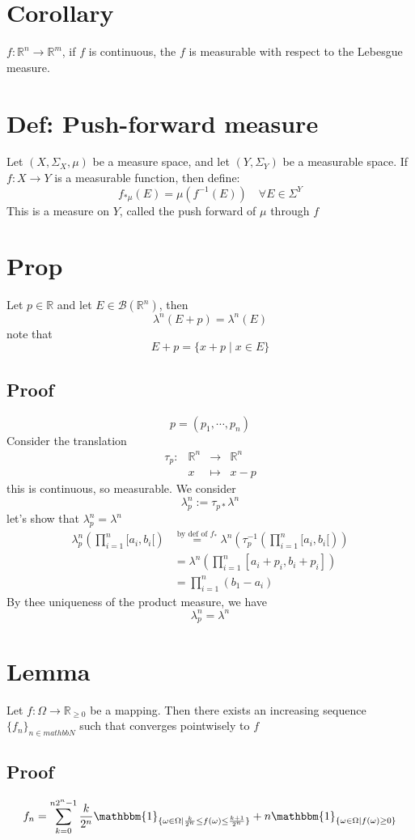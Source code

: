 \documentclass{book}
\newcommand{\leftbracket}{[}
\newcommand{\rightbracket}{]}
\begin{document}
\section{Corollary}
$f:\mathbb{R}^n\rightarrow\mathbb{R}^m$, if $f$ is continuous, the $f$ is measurable with respect to the Lebesgue measure.
\section{Def: Push-forward measure}
Let $(X,\Sigma_X,\mu)$ be a measure space, and let $(Y,\Sigma_Y)$ be a measurable space. If $f:X\rightarrow Y$ is a measurable function, then define:
$$f_{*\mu}(E)=\mu(f^{-1}(E))\quad \forall E\in \Sigma^Y$$
This is a measure on $Y$, called the push forward of $\mu$ through $f$
\section{Prop}
Let $p\in \mathbb{R}$ and let $E\in \mathscr{B}(\mathbb{R}^n)$, then $$\lambda^n(E+p)=\lambda^n(E)$$
note that
$$E+p=\{x+p\mid x\in E\}$$
\subsection*{Proof}
$$p=(p_1,\cdots,p_n)$$ Consider the translation
$$\begin{aligned}
    \tau_p: &\mathbb{R}^n&\rightarrow&\mathbb{R}^n\\ &x&\mapsto&x-p
\end{aligned}$$
this is continuous, so measurable. We consider$$\lambda^n_p:=\tau_{p*}\lambda^n$$
let's show that $\lambda^n_p=\lambda^n$
$$
\begin{aligned}
    \lambda^n_p(\prod\limits_{i=1}^n\leftbracket a_i,b_i\leftbracket) &\stackrel{\text{by def of }f_* }{=}\lambda^n(\tau_p^{-1}(\prod\limits_{i=1}^n\leftbracket a_i,b_i\leftbracket))\\
    &=\lambda^n(\prod\limits_{i=1}^n\leftbracket a_i+p_i,b_i+p_i\rightbracket)\\
    &=\prod\limits_{i=1}^n(b_1-a_i)
\end{aligned}$$
By thee uniqueness of the product measure, we have $$\lambda^n_p=\lambda^n$$
\section{Lemma}
\label{Lemma 53.23}
Let $f:\Omega\rightarrow\mathbb{R}_{\geq0}$ be a mapping. Then there exists an increasing sequence $\{f_n\}_{n\in mathbb{N}}$ such that converges pointwisely to $f$
\subsection*{Proof}
$$f_n=\sum\limits_{k=0}^{n2^n-1}\frac{k}{2^n}\mathbbm{1}_{\{\omega\in \Omega\mid \frac{k}{2^n}\leq f(\omega)\leq \frac{k+1}{2^n}\}}+n\mathbbm{1}_{\{\omega\in \Omega\mid f(\omega)\geq 0\}}$$
\end{document}

